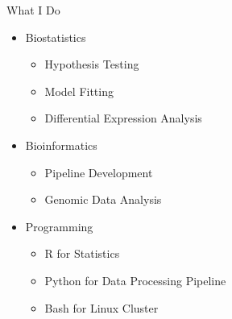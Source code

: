 \documentclass[aspectratio=169,xcolor=dvipsnames]{beamer}
\begin{document}
\begin{frame}{What I Do}
    \begin{itemize}
        \item Biostatistics
        \begin{itemize}
            \item Hypothesis Testing
            \item Model Fitting
            \item Differential Expression Analysis
        \end{itemize}
        \item Bioinformatics
        \begin{itemize}
            \item Pipeline Development
            \item Genomic Data Analysis
        \end{itemize}
        \item Programming
        \begin{itemize}
            \item R for Statistics
            \item Python for Data Processing Pipeline
            \item Bash for Linux Cluster
        \end{itemize}
    \end{itemize}



\end{frame}
\end{document}
